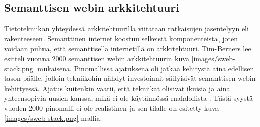 \documentclass[finnish, 12pt, a4paper, elec, utf8, pdfa, online]{aaltothesis}
\begin{document}
{\subsection{Semanttisen webin arkkitehtuuri}
Tietotekniikan yhteydessä arkkitehtuurilla viitataan ratkaisujen jäsentelyyn eli rakenteeseen. Semanttinen internet koostuu selkeistä komponenteista, joten voidaan puhua, että semanttisella internetillä on arkkitehtuuri. Tim-Berners lee esitteli vuonna 2000 semanttisen webin arkkitehtuurin kuva \ref{images/sweb-stack.png} mukaisena. Pinomallissa ajatuksena oli jatkaa kehitystä aina edellisen tason päälle, jolloin tekniikohin nähdyt investoinnit säilyisivät semanttisen webin kehittyessä. Ajatus kuitenkin vaatii, että tekniikat olisivat ikuisia ja aina yhteensopivia uusien kanssa, mikä ei ole käytännössä mahdollista \cite{stack}. Tästä syystä vuoden 2000 pinomalli ei ole realistinen ja sen tilalle on esitetty kuva \ref{images/sweb-stack.png} mallia.

}
\end{document}
